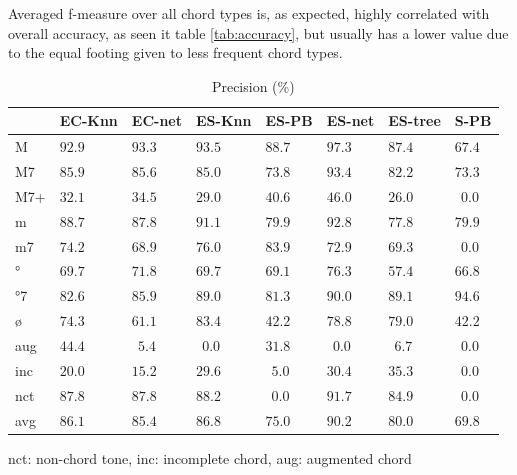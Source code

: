 \documentclass{article}
\begin{document}
Averaged f-measure over all chord types is, as expected, highly
correlated with overall accuracy, as seen it table \ref{tab:accuracy},
but usually has a lower value due to the equal footing given to less
frequent chord types.


\begin{table}
  \centering
  \begin{tabular}{l|p{.5cm}p{.5cm}p{.5cm}p{.5cm}p{.5cm}p{.5cm}p{.5cm}}
   & EC-Knn&EC-net &ES-Knn &ES-PB  &ES-net &ES-tree&S-PB     \\
\hline                                             
M  &$ 92.9$&$ 93.3$&$ 93.5$&$ 88.7$&$ 97.3$&$ 87.4$&$ 67.4$  \\
M7 &$ 85.9$&$ 85.6$&$ 85.0$&$ 73.8$&$ 93.4$&$ 82.2$&$ 73.3$  \\
M7+&$ 32.1$&$ 34.5$&$ 29.0$&$ 40.6$&$ 46.0$&$ 26.0$&$~~0.0$  \\
m  &$ 88.7$&$ 87.8$&$ 91.1$&$ 79.9$&$ 92.8$&$ 77.8$&$ 79.9$  \\
m7 &$ 74.2$&$ 68.9$&$ 76.0$&$ 83.9$&$ 72.9$&$ 69.3$&$~~0.0$  \\
°  &$ 69.7$&$ 71.8$&$ 69.7$&$ 69.1$&$ 76.3$&$ 57.4$&$ 66.8$  \\
°7 &$ 82.6$&$ 85.9$&$ 89.0$&$ 81.3$&$ 90.0$&$ 89.1$&$ 94.6$  \\
ø  &$ 74.3$&$ 61.1$&$ 83.4$&$ 42.2$&$ 78.8$&$ 79.0$&$ 42.2$  \\
aug&$ 44.4$&$~~5.4$&$~~0.0$&$ 31.8$&$~~0.0$&$~~6.7$&$~~0.0$  \\
inc&$ 20.0$&$ 15.2$&$ 29.6$&$~~5.0$&$ 30.4$&$ 35.3$&$~~0.0$  \\
nct&$ 87.8$&$ 87.8$&$ 88.2$&$~~0.0$&$ 91.7$&$ 84.9$&$~~0.0$  \\
avg&$ 86.1$&$ 85.4$&$ 86.8$&$ 75.0$&$ 90.2$&$ 80.0$&$ 69.8$  \\

  \end{tabular}

\medskip

nct: non-chord tone, inc: incomplete chord, aug: augmented chord

  \caption{Precision (\%)}
  \label{tab:precision}
\end{table}
\end{document}
